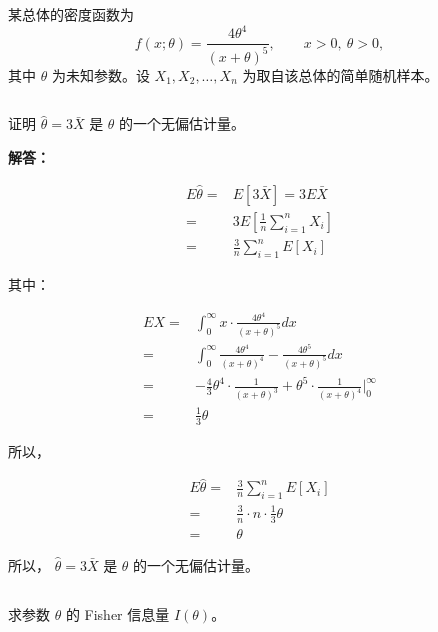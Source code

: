 \documentclass[12pt,a4paper]{article}
\begin{document}
某总体的密度函数为
\[
  f(x;\theta)=\frac{4\theta^4}{(x+\theta)^5},\qquad x>0,\ \theta>0,
\]
其中 $\theta$ 为未知参数。设 $X_1,X_2,\ldots,X_n$ 为取自该总体的简单随机样本。

\subsection{}

证明 $\hat{\theta}=3\bar{X}$ 是 $\theta$ 的一个无偏估计量。

\begin{answerbox}
\textbf{解答：}

$$
\begin{aligned}
E\hat{\theta} =& E[3\bar{X}] = 3E\bar{X} \\
=& 3 E\left[\frac{1}{n}\sum_{i=1}^{n} X_i\right] \\
=& \frac{3}{n} \sum_{i=1}^{n} E[X_i]
\end{aligned}
$$

其中：

$$
\begin{aligned}
EX =& \int_0^{\infty} x \cdot \frac{4\theta^4}{(x+\theta)^5} dx \\
=& \int_0^{\infty} \frac{4 \theta^4}{(x+\theta)^4} - \frac{4\theta^5}{(x+\theta)^5}dx \\
=& -\frac{4}{3}\theta^4 \cdot \frac{1}{(x+\theta)^3} + \theta^5 \cdot \frac{1}{(x+\theta)^4} \Big|_0^{\infty} \\
=& \frac{1}{3}\theta
\end{aligned}
$$

所以，

$$
\begin{aligned}
E\hat{\theta} =& \frac{3}{n} \sum_{i=1}^{n} E[X_i] \\
=& \frac{3}{n} \cdot n \cdot \frac{1}{3}\theta \\
=& \theta
\end{aligned}
$$

所以， $\hat{\theta}=3\bar{X}$ 是 $\theta$ 的一个无偏估计量。
\end{answerbox}

\subsection{}

求参数 $\theta$ 的 Fisher 信息量 $I(\theta)$。
\end{document}
